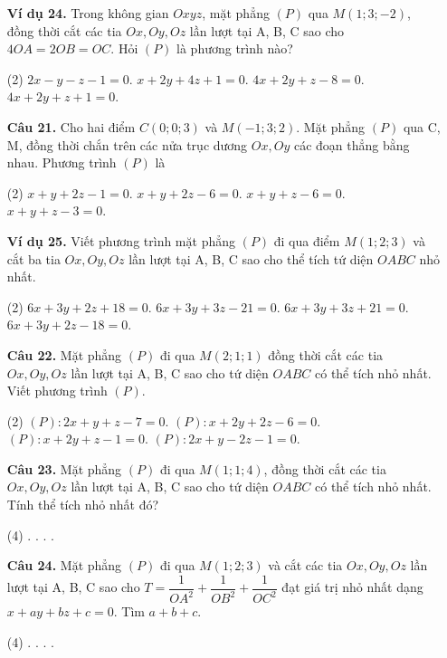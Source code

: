 \documentclass[12pt, a4paper]{article}
\begin{document}
\begin{enumerate}[label=\textbf{\arabic*.}, wide=0pt, leftmargin=*]
    \item[\textbf{Ví dụ 24.}] Trong không gian \(Oxyz\), mặt phẳng \((P)\) qua \(M(1;3;-2)\), đồng thời cắt các tia \(Ox, Oy, Oz\) lần lượt tại A, B, C sao cho \(4OA=2OB=OC\). Hỏi \((P)\) là phương trình nào?
    \begin{tasks}(2)
        \task \(2x-y-z-1=0\).
        \task \(x+2y+4z+1=0\).
        \task \(4x+2y+z-8=0\).
        \task \(4x+2y+z+1=0\).
    \end{tasks}
    
    \item[\textbf{Câu 21.}] Cho hai điểm \(C(0;0;3)\) và \(M(-1;3;2)\). Mặt phẳng \((P)\) qua C, M, đồng thời chắn trên các nửa trục dương \(Ox, Oy\) các đoạn thẳng bằng nhau. Phương trình \((P)\) là
    \begin{tasks}(2)
        \task \(x+y+2z-1=0\).
        \task \(x+y+2z-6=0\).
        \task \(x+y+z-6=0\).
        \task \(x+y+z-3=0\).
    \end{tasks}
    
    \item[\textbf{Ví dụ 25.}] Viết phương trình mặt phẳng \((P)\) đi qua điểm \(M(1;2;3)\) và cắt ba tia \(Ox, Oy, Oz\) lần lượt tại A, B, C sao cho thể tích tứ diện \(OABC\) nhỏ nhất.
    \begin{tasks}(2)
        \task \(6x+3y+2z+18=0\).
        \task \(6x+3y+3z-21=0\).
        \task \(6x+3y+3z+21=0\).
        \task \(6x+3y+2z-18=0\).
    \end{tasks}
    
    \item[\textbf{Câu 22.}] Mặt phẳng \((P)\) đi qua \(M(2;1;1)\) đồng thời cắt các tia \(Ox, Oy, Oz\) lần lượt tại A, B, C sao cho tứ diện \(OABC\) có thể tích nhỏ nhất. Viết phương trình \((P)\).
    \begin{tasks}(2)
        \task \((P): 2x+y+z-7=0\).
        \task \((P): x+2y+2z-6=0\).
        \task \((P): x+2y+z-1=0\).
        \task \((P): 2x+y-2z-1=0\).
    \end{tasks}
    
    \item[\textbf{Câu 23.}] Mặt phẳng \((P)\) đi qua \(M(1;1;4)\), đồng thời cắt các tia \(Ox, Oy, Oz\) lần lượt tại A, B, C sao cho tứ diện \(OABC\) có thể tích nhỏ nhất. Tính thể tích nhỏ nhất đó?
    \begin{tasks}(4)
        .
        .
        .
        .
    \end{tasks}

    \item[\textbf{Câu 24.}] Mặt phẳng \((P)\) đi qua \(M(1;2;3)\) và cắt các tia \(Ox, Oy, Oz\) lần lượt tại A, B, C sao cho \(T = \dfrac{1}{OA^2} + \dfrac{1}{OB^2} + \dfrac{1}{OC^2}\) đạt giá trị nhỏ nhất dạng \(x+ay+bz+c=0\). Tìm \(a+b+c\).
    \begin{tasks}(4)
        .
        .
        .
        .
    \end{tasks}
    

\end{enumerate}
\end{document}
